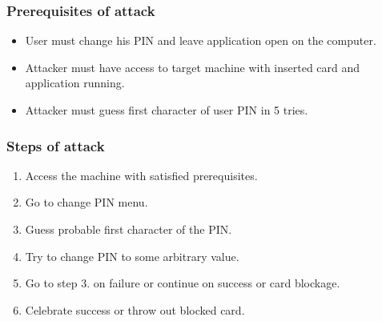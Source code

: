 \documentclass[letterpaper]{article}
\begin{document}
\subsubsection*{Prerequisites of attack}
\begin{itemize}
\item User must change his PIN and leave application open on the computer.
\item Attacker must have access to target machine with inserted card and application running.
\item Attacker must guess first character of user PIN in 5 tries.
\end{itemize}

\subsubsection*{Steps of attack}
\begin{enumerate}
\item Access the machine with satisfied prerequisites.
\item Go to change PIN menu.
\item Guess probable first character of the PIN.
\item Try to change PIN to some arbitrary value.
\item Go to step 3. on failure or continue on success or card blockage.
\item Celebrate success or throw out blocked card.
\end{enumerate}
 
\end{document}
